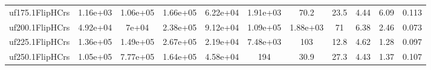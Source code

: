 \begin{table}[htbp]
\begin{tabular}{|ccccccccccc|}
uf175.1FlipHCrs & 1.16e+03 & 1.06e+05 & 1.66e+05 & 6.22e+04 & 1.91e+03 & 70.2 & 23.5 & 4.44 & 6.09 & 0.113 \\
uf200.1FlipHCrs & 4.92e+04 & 7e+04 & 2.38e+05 & 9.12e+04 & 1.09e+05 & 1.88e+03 &   71 & 6.38 & 2.46 & 0.073 \\
uf225.1FlipHCrs & 1.36e+05 & 1.49e+05 & 2.67e+05 & 2.19e+04 & 7.48e+03 &  103 & 12.8 & 4.62 & 1.28 & 0.097 \\
uf250.1FlipHCrs & 1.05e+05 & 7.77e+05 & 1.64e+05 & 4.58e+04 &  194 & 30.9 & 27.3 & 4.43 & 1.37 & 0.107 \\
\hline
\end{tabular}
\end{table}
